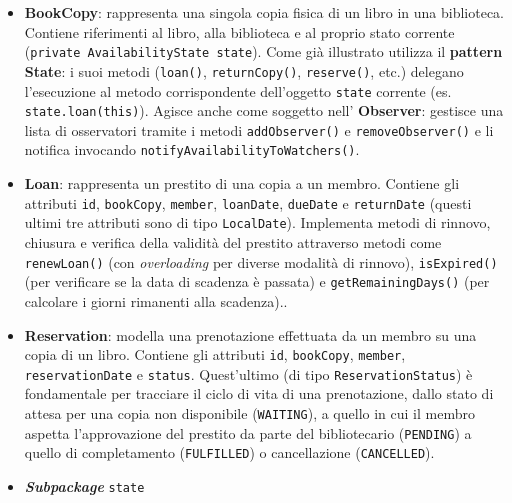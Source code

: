 \documentclass[
  italian,
  paper=a4,
  ,captions=tableheading
]{scrbook}
\newcommand{\passthrough}[1]{#1}
\begin{document}
\begin{itemize}
  informazioni come \passthrough{\lstinline!isbn!},
  \passthrough{\lstinline!title!}, \passthrough{\lstinline!author!},
  \passthrough{\lstinline!publicationYear!} e
  \passthrough{\lstinline!genre!} (questi ultimi due possono essere
  nulli). Ogni istanza rappresenta un titolo univoco nel sistema e non è
  modificabile dopo la creazione.
\item
  \textbf{BookCopy}: rappresenta una singola copia fisica di un libro in
  una biblioteca. Contiene riferimenti al libro, alla biblioteca e al
  proprio stato corrente
  (\passthrough{\lstinline!private AvailabilityState state!}). Come già
  illustrato utilizza il \textbf{pattern State}: i suoi metodi
  (\passthrough{\lstinline!loan()!},
  \passthrough{\lstinline!returnCopy()!},
  \passthrough{\lstinline!reserve()!}, etc.) delegano l'esecuzione al
  metodo corrispondente dell'oggetto \passthrough{\lstinline!state!}
  corrente (es. \passthrough{\lstinline!state.loan(this)!}). Agisce
  anche come soggetto nell' \textbf{Observer}: gestisce una lista di
  osservatori tramite i metodi \passthrough{\lstinline!addObserver()!} e
  \passthrough{\lstinline!removeObserver()!} e li notifica invocando
  \passthrough{\lstinline!notifyAvailabilityToWatchers()!}.
\item
  \textbf{Loan}: rappresenta un prestito di una copia a un membro.
  Contiene gli attributi \passthrough{\lstinline!id!},
  \passthrough{\lstinline!bookCopy!}, \passthrough{\lstinline!member!},
  \passthrough{\lstinline!loanDate!}, \passthrough{\lstinline!dueDate!}
  e \passthrough{\lstinline!returnDate!} (questi ultimi tre attributi
  sono di tipo \passthrough{\lstinline!LocalDate!}). Implementa metodi
  di rinnovo, chiusura e verifica della validità del prestito attraverso
  metodi come \passthrough{\lstinline!renewLoan()!} (con
  \emph{overloading} per diverse modalità di rinnovo),
  \passthrough{\lstinline!isExpired()!} (per verificare se la data di
  scadenza è passata) e \passthrough{\lstinline!getRemainingDays()!}
  (per calcolare i giorni rimanenti alla scadenza)..
\item
  \textbf{Reservation}: modella una prenotazione effettuata da un membro
  su una copia di un libro. Contiene gli attributi
  \passthrough{\lstinline!id!}, \passthrough{\lstinline!bookCopy!},
  \passthrough{\lstinline!member!},
  \passthrough{\lstinline!reservationDate!} e
  \passthrough{\lstinline!status!}. Quest'ultimo (di tipo
  \passthrough{\lstinline!ReservationStatus!}) è fondamentale per
  tracciare il ciclo di vita di una prenotazione, dallo stato di attesa
  per una copia non disponibile (\passthrough{\lstinline!WAITING!}), a
  quello in cui il membro aspetta l'approvazione del prestito da parte
  del bibliotecario (\passthrough{\lstinline!PENDING!}) a quello di
  completamento (\passthrough{\lstinline!FULFILLED!}) o cancellazione
  (\passthrough{\lstinline!CANCELLED!}).
\item
  \textbf{\emph{Subpackage}} \passthrough{\lstinline!state!}


\end{itemize}
\end{document}
